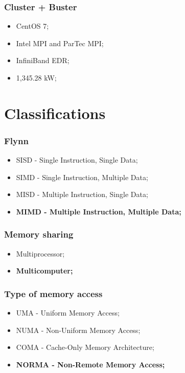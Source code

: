 \documentclass{beamer}
\begin{document}
\begin{frame}
  \frametitle{Cluster + Buster}
  \begin{itemize}
    \item CentOS 7;
    \item Intel MPI and ParTec MPI;
    \item InfiniBand EDR;
    \item 1,345.28 kW;
  \end{itemize}
\end{frame}


\section{Classifications}

\begin{frame}
  \frametitle{Flynn}
  \begin{itemize}
    \item SISD - Single Instruction, Single Data;
    \item SIMD - Single Instruction, Multiple Data;
    \item MISD - Multiple Instruction, Single Data;
    \item \textbf{MIMD - Multiple Instruction, Multiple Data;}
  \end{itemize}
\end{frame}

\begin{frame}
  \frametitle{Memory sharing}
  \begin{itemize}
    \item Multiprocessor;
    \item \textbf{Multicomputer;}
  \end{itemize}

\end{frame}

\begin{frame}
  \frametitle{Type of memory access}
  \begin{itemize}
    \item UMA - Uniform Memory Access;
    \item NUMA - Non-Uniform Memory Access;
    \item COMA - Cache-Only Memory Architecture;
    \item \textbf{NORMA - Non-Remote Memory Access;}
  \end{itemize}

\end{frame}
\end{document}

